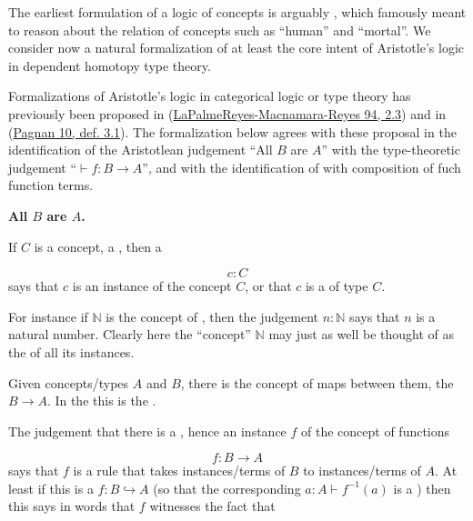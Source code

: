 \documentclass[12pt,titlepage]{article}
\theoremstyle{plain}
\theoremstyle{definition}
\theoremstyle{remark}
\begin{document}
The earliest formulation of a logic of concepts is arguably , which famously meant to reason about the relation of concepts such as ``human'' and ``mortal''. We consider now a natural formalization of at least the core intent of Aristotle's logic in dependent homotopy type theory.

Formalizations of Aristotle's logic in categorical logic or type theory has previously been proposed in (\hyperlink{PalmeReyesMacnamaraReyes94}{LaPalmeReyes-Macnamara-Reyes 94, 2.3}) and in (\hyperlink{Pagnan10}{Pagnan 10, def. 3.1}). The formalization below agrees with these proposal in the identification of the Aristotlean judgement ``All $B$ are $A$'' with the type-theoretic judgement ``$\vdash f \colon B\to A$'', and with the identification of  with composition of fuch function terms.

\textbf{All $B$ are $A$.}

If $C$ is a concept, a , then a 

\begin{displaymath}
c \colon C
\end{displaymath}
says that $c$ is an instance of the concept $C$, or that $c$ is a  of type $C$.

For instance if $\mathbb{N}$ is the concept of , then the judgement $n \colon \mathbb{N}$ says that $n$ is a natural number. Clearly here the ``concept'' $\mathbb{N}$ may just as well be thought of as the  of all its instances.

Given concepts/types $A$ and $B$, there is the concept of maps between them, the  $B\to A$. In the  this is the .

The judgement that there is a , hence an instance $f$ of the concept of functions

\begin{displaymath}
f \colon B \longrightarrow A
\end{displaymath}
says that $f$ is a rule that takes instances/terms of $B$ to instances/terms of $A$. At least if this is a  $f \colon B \hookrightarrow A$ (so that the corresponding $a\colon A \vdash f^{-1}(a)$ is a ) then this says in words that $f$ witnesses the fact that
\end{document}
